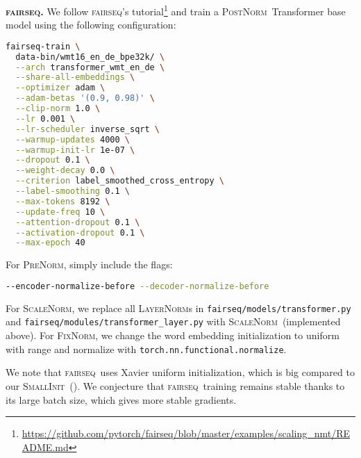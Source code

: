 \documentclass[11pt,a4paper]{article}
\newcommand{\LNorm}{\textsc{LayerNorm}}
\newcommand{\SCNorm}{\textsc{ScaleNorm}}
\newcommand{\PreNorm}{\textsc{PreNorm}}
\newcommand{\PostNorm}{\textsc{PostNorm}}
\newcommand{\FairSeq}{\textsc{fairseq}}
\newcommand{\fixnorm}{\textsc{FixNorm}}
\newcommand{\SmallInit}{\textsc{SmallInit}}
\renewcommand{\paragraph}[1]{\par\medskip\noindent\textbf{#1}}
\begin{document}
\paragraph{\FairSeq.}
\label{listing-fairseq}
We follow \FairSeq's tutorial\footnote{\url{https://github.com/pytorch/fairseq/blob/master/examples/scaling_nmt/README.md}} and train a \PostNorm\ Transformer base model using the following configuration:

\small
\begin{lstlisting}[language=bash]
  fairseq-train \
  data-bin/wmt16_en_de_bpe32k/ \
  --arch transformer_wmt_en_de \
  --share-all-embeddings \
  --optimizer adam \
  --adam-betas '(0.9, 0.98)' \
  --clip-norm 1.0 \
  --lr 0.001 \
  --lr-scheduler inverse_sqrt \
  --warmup-updates 4000 \
  --warmup-init-lr 1e-07 \
  --dropout 0.1 \
  --weight-decay 0.0 \
  --criterion label_smoothed_cross_entropy \
  --label-smoothing 0.1 \
  --max-tokens 8192 \
  --update-freq 10 \
  --attention-dropout 0.1 \
  --activation-dropout 0.1 \
  --max-epoch 40
\end{lstlisting}
\normalsize

For \PreNorm, simply include the flags:
\small
\begin{lstlisting}[language=bash]
	--encoder-normalize-before --decoder-normalize-before
\end{lstlisting}
\normalsize

For \SCNorm, we replace all {\LNorm}s in {\texttt{fairseq/models/transformer.py}} and {\texttt{fairseq/modules/transformer\_layer.py}} with \SCNorm\ (implemented above). For \fixnorm, we change the word embedding initialization to uniform with range  and normalize with {\lstinline{torch.nn.functional.normalize}}.  

We note that \FairSeq\ uses Xavier uniform initialization, which is big compared to our \SmallInit\ (). We conjecture that \FairSeq\ training remains stable thanks to its large batch size, which gives more stable gradients. 
 
\end{document}
